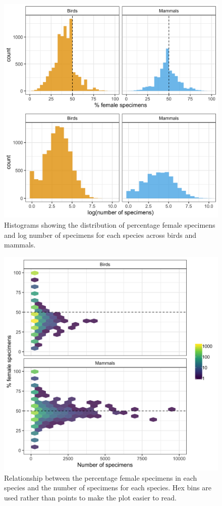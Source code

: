 \documentclass[a4paper, 12pt]{article}
\begin{document}
\begin{figure}[H]
 \centering
  \includegraphics[width = \linewidth]{figures/histogram-specimen-counts.png}
  \caption{Histograms showing the distribution of percentage female specimens and log number of specimens for each species across birds and mammals.}
  \label{fig-histograms}
\end{figure}

\begin{figure}[H]
 \centering
  \includegraphics[width = \linewidth]{figures/specimens-numbers-all.png}
  \caption{Relationship between the percentage female specimens in each species and the number of specimens for each species. 
  Hex bins are used rather than points to make the plot easier to read.}
  \label{fig-hex}
\end{figure}
\end{document}
